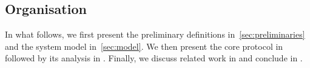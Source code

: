 


\subsection{Organisation}

In what follows, we first present the preliminary definitions in~\cref{sec:preliminaries} and the system model in~\cref{sec:model}.
We then present the core \codename{} protocol in  followed by its analysis in . Finally, we discuss related work in  and conclude in .
